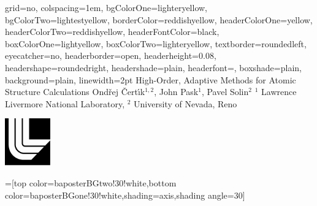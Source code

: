 \documentclass[landscape,final]{baposter}
\begin{document}
\begin{poster}{
  grid=no,
  colspacing=1em,
  bgColorOne=lighteryellow,
  bgColorTwo=lightestyellow,
  borderColor=reddishyellow,
  headerColorOne=yellow,
  headerColorTwo=reddishyellow,
  headerFontColor=black,
  boxColorOne=lightyellow,
  boxColorTwo=lighteryellow,
  textborder=roundedleft,
  eyecatcher=no,
  headerborder=open,
  headerheight=0.08\textheight,
  headershape=roundedright,
  headershade=plain,
  headerfont=\Large\textsf, %
  boxshade=plain,
  background=plain,
  linewidth=2pt
  }
  {} %
  {\sf %
  High-Order, Adaptive Methods for Atomic Structure Calculations}
  {\sf %
  Ond\v rej \v Cert\'\i k$^{1,2}$, John Pask$^1$, Pavel Solin$^2$
  \hspace{3em}$^1$ Lawrence Livermore National Laboratory,
  $^2$ University of Nevada, Reno
  }
  {{\begin{minipage}{16em}
    \hfill
    \includegraphics[height=5.5em]{llnl_logo}
  \end{minipage}}
  }

  =[top color=baposterBGtwo!30!white,bottom color=baposterBGone!30!white,shading=axis,shading angle=30]

     \newlength{\leftimgwidth}
     \setlength{\leftimgwidth}{0.78em+8.0em}

    \newcommand{\colouredcircle}[1]{%
      \tikz{\useasboundingbox (-0.2em,-0.32em) rectangle(0.2em,0.32em); \draw[draw=black,fill=baposterBGone!80!black!#1!white,line width=0.03em] (0,0) circle(0.18em);}}


\end{poster}
\end{document}
